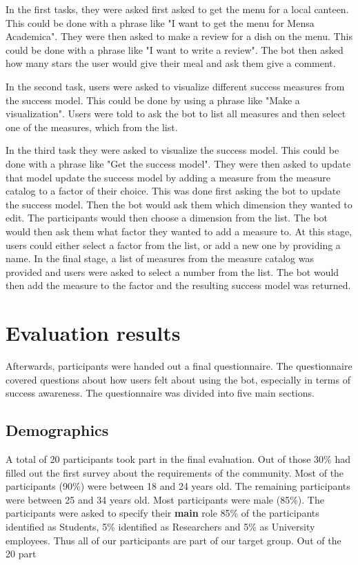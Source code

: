 In the first tasks, they were asked first asked to get the menu for a local canteen. This could be done with a phrase like "I want to get the menu for Mensa Academica".
They were then asked to make a review for a dish on the menu. This could be done with a phrase like "I want to write a review". The bot then asked how many stars the user would give their meal and ask them give a comment.  

In the second task, users were asked to visualize different success measures from the success model. This could be done by using a phrase like "Make a visualization". Users were told to ask the bot to list all measures and then select one of the measures, which from the list.

In the third task they were asked to visualize the success model. This could be done with a phrase like "Get the success model". They were then asked to update that model update the success model by adding a measure from the measure catalog to a factor of their choice. This was done first asking the bot to update the success model. Then the bot would ask them which dimension they wanted to edit. The participants would then choose a dimension from the list. The bot would then ask them what factor they wanted to add a measure to. At this stage, users could either select a factor from the list, or add a new one by providing a name. In the final stage, a list of measures from the measure catalog was provided and users were asked to select a number from the list. The bot would then add the measure to the factor and the resulting success model was returned.

\section{Evaluation results}

Afterwards, participants were handed out a final questionnaire.
The questionnaire covered questions about how users felt about using the bot, especially in terms of success awareness. The questionnaire was divided into five main sections. 

\subsection{Demographics}
A total of 20 participants took part in the final evaluation. Out of those 30\% had filled out the first survey about the requirements of the community. 
Most of the participants (90\%) were between 18 and 24 years old. The remaining participants were between 25 and 34 years old. Most participants were male (85\%).
The participants were asked to specify their \textbf{main} role 85\% of the participants identified as Students, 5\% identified as Researchers and 5\% as University employees. Thus all of our participants are part of our target group. Out of the 20 part 

